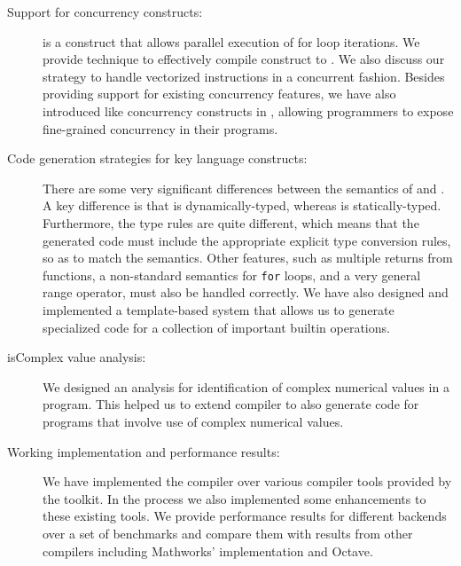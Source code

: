 \begin{description}


\item[Support for concurrency constructs:] \parfor is a \matlab construct that 
allows parallel execution of for loop         
iterations. We provide technique to effectively compile              
\parfor construct to \xten. We also discuss our strategy to handle              
vectorized instructions in a concurrent fashion.  Besides providing support for
existing \matlab concurrency features, we have also introduced \xten like
concurrency constructs in \matlab,                
allowing \matlab programmers to expose fine-grained concurrency in their        
programs.

\item[Code generation strategies for key language constructs:]  There
are some very significant differences between the semantics of \matlab
and \xten.  A key difference is that \matlab is dynamically-typed,
whereas \xten is statically-typed.   Furthermore, the type rules are
quite different, which means that the generated \xten code must include
the appropriate explicit type conversion rules, so as to match the
\matlab semantics.   Other \matlab features, such as multiple returns
from functions, a non-standard semantics for \texttt{for} loops, and a
very general range operator, must also be handled correctly.  We
have also designed and implemented a template-based system that allows us to
generate specialized \xten code for a collection of important \matlab builtin
operations.

\item[isComplex value analysis:] We designed an analysis for identification of 
complex numerical values in a \matlab program. This helped us to extend \mixten
compiler to also generate \xten code for \matlab programs that involve use of
complex numerical values. 

\item[Working implementation and performance results:] We have implemented the 
\mixten compiler over various \matlab compiler tools provided by the \mclab
toolkit.  
In the process we also implemented some enhancements to these existing tools.
We provide performance results for different \xten backends over a set 
of benchmarks and compare them with results from other \matlab compilers
including Mathworks' \matlab implementation and Octave.

\end{description}

